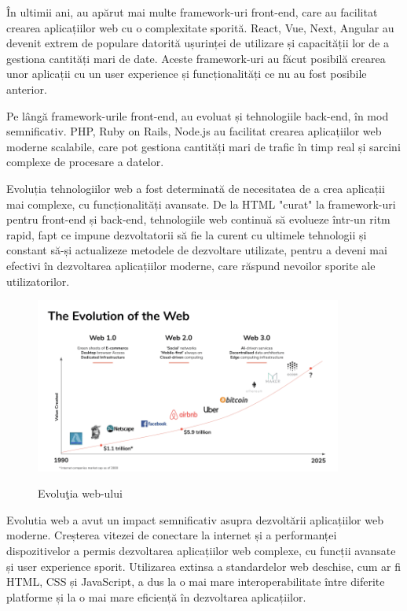 \documentclass[12pt, a4paper]{report}
\begin{document}
În ultimii ani, au apărut mai multe framework-uri front-end, care au facilitat crearea aplicațiilor web cu o complexitate sporită. React, Vue, Next, Angular au devenit extrem de populare datorită ușurinței de utilizare și capacității lor de a gestiona cantități mari de date. Aceste framework-uri au făcut posibilă crearea unor aplicații cu un user experience și funcționalități ce nu au fost posibile anterior.

Pe lângă framework-urile front-end, au evoluat și tehnologiile back-end, în mod semnificativ. PHP, Ruby on Rails, Node.js au facilitat crearea aplicațiilor web moderne scalabile, care pot gestiona cantități mari de trafic în timp real și sarcini complexe de procesare a datelor.

Evoluția tehnologiilor web a fost determinată de necesitatea de a crea aplicații mai complexe, cu funcționalități avansate. De la HTML "curat" la framework-uri pentru front-end și back-end, tehnologiile web continuă să evolueze într-un ritm rapid, fapt ce impune dezvoltatorii să fie la curent cu ultimele tehnologii și constant să-și actualizeze metodele de dezvoltare utilizate, pentru a deveni mai efectivi în dezvoltarea aplicațiilor moderne, care răspund nevoilor sporite ale utilizatorilor.

\begin{figure}[htbp]
	\centering
	\includegraphics[width=0.9\textwidth]{web-evolution.png} \label{fig:web-evolution}
	\caption{Evolu\c tia web-ului \protect\footnotemark}
\end{figure}


Evolutia web a avut un impact semnificativ asupra dezvoltării aplicațiilor web moderne. Creșterea vitezei de conectare la internet și a performanței dispozitivelor a permis dezvoltarea aplicațiilor web complexe, cu funcții avansate și user experience sporit. Utilizarea extinsa a standardelor web deschise, cum ar fi HTML, CSS și JavaScript, a dus la o mai mare interoperabilitate între diferite platforme și la o mai mare eficiență în dezvoltarea aplicațiilor.
\end{document}
